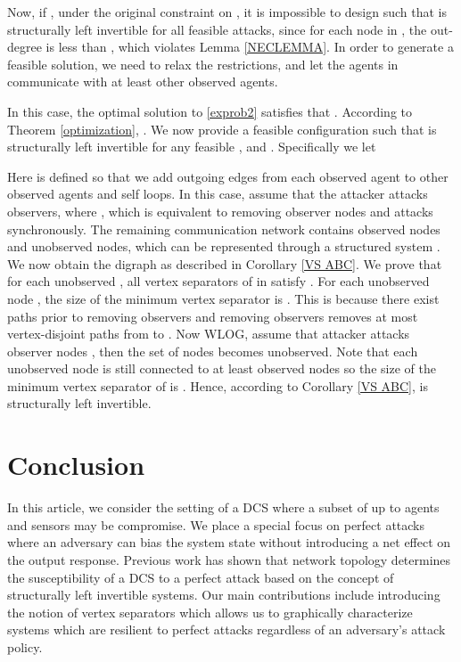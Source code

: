 \documentclass[letterpaper, 10 pt, conference]{ieeeconf}
\begin{document}
Now, if , under the original constraint on , it is impossible to design  such that  is structurally left invertible for all feasible attacks, since for each node in , the out-degree is less than , which violates Lemma \ref{NECLEMMA}. In order to generate a feasible solution, we need to relax the restrictions, and let the agents in  communicate with at least  other observed agents. 


In this case, the optimal solution to \eqref{exprob2} satisfies that . According to Theorem \ref{optimization}, . We now provide a feasible configuration  such that  is structurally left invertible for any feasible , and . Specifically we let

Here  is defined so that we add outgoing edges from each observed agent to  other observed agents and self loops. In this case, assume that the attacker attacks  observers, where , which is equivalent to removing  observer nodes and  attacks synchronously. The remaining communication network contains  observed nodes and  unobserved nodes, which can be represented through a structured system . We now obtain the digraph  as described in Corollary \ref{VS ABC}. We prove that for each unobserved , all vertex separators  of  in  satisfy . For each unobserved node , the size of the minimum vertex separator is . This is because there exist  paths prior to removing observers and removing  observers removes at most  vertex-disjoint paths from  to . Now WLOG, assume that attacker attacks observer nodes , then the set of nodes  becomes unobserved. Note that each unobserved node  is still connected to at least  observed nodes so the size of the minimum vertex separator  of  is . Hence, according to Corollary \ref{VS ABC},  is structurally left invertible.


 

\section{Conclusion}
In this article, we consider the setting of a DCS where a subset of up to  agents and sensors may be compromise. We place a special focus on perfect attacks where an adversary can bias the system state without introducing a net effect on the output response. Previous work has shown that network topology determines the susceptibility of a DCS to a perfect attack based on the concept of structurally left invertible systems. Our main contributions include introducing the notion of vertex separators which allows us to graphically characterize systems which are resilient to perfect attacks regardless of an adversary's attack policy. 
\end{document}
